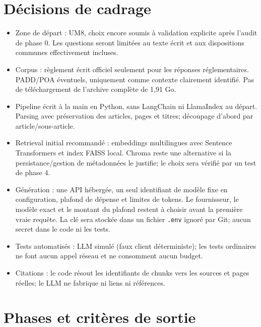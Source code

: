 \documentclass[11pt,a4paper]{article}
\begin{document}
\section*{Décisions de cadrage}
\begin{itemize}
  \item Zone de départ : UM8, choix encore soumis à validation explicite après l'audit de phase 0. Les questions seront limitées au texte écrit et aux dispositions communes effectivement incluses.
  \item Corpus : règlement écrit officiel seulement pour les réponses réglementaires. PADD/POA éventuels, uniquement comme contexte clairement identifié. Pas de téléchargement de l'archive complète de 1,91 Go.
  \item Pipeline écrit à la main en Python, sans LangChain ni LlamaIndex au départ. Parsing avec préservation des articles, pages et titres; découpage d'abord par article/sous-article.
  \item Retrieval initial recommandé : embeddings multilingues avec Sentence Transformers et index FAISS local. Chroma reste une alternative si la persistance/gestion de métadonnées le justifie; le choix sera vérifié par un test de phase 4.
  \item Génération : une API hébergée, un seul identifiant de modèle fixe en configuration, plafond de dépense et limites de tokens. Le fournisseur, le modèle exact et le montant du plafond restent à choisir avant la première vraie requête. La clé sera stockée dans un fichier \texttt{.env} ignoré par Git; aucun secret dans le code ni les tests.
  \item Tests automatisés : LLM simulé (faux client déterministe); les tests ordinaires ne font aucun appel réseau et ne consomment aucun budget.
  \item Citations : le code résout les identifiants de chunks vers les sources et pages réelles; le LLM ne fabrique ni liens ni références.
\end{itemize}

\section*{Phases et critères de sortie}
\end{document}

